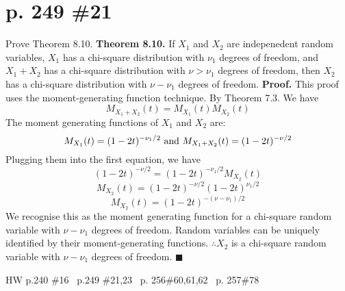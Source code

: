 \documentclass[12pt]{article}
\begin{document}
	\section[20pt]{p. 249 \#21}
	Prove Theorem 8.10.
	\newline \newline
	\textbf{Theorem 8.10. } If \(X_1\) and \(X_2\) are indepenedent random variables, \(X_1\) has a chi-square distribution with \(\nu_1\) degrees of freedom, and \(X_1+X_2\) has a chi-square distribution with \(\nu > \nu_1\) degrees of freedom, then \(X_2\) has a chi-square distribution with \(\nu - \nu_1\) degrees of freedom. \newline
	\textbf{Proof.}
	\newline
	This proof uses the moment-generating function technique.
	\newline
	By Theorem 7.3. We have
	\[M_{X_1 + X_2}(t) = M_{X_1}(t)M_{X_2}(t)\]
	The moment generating functions of \(X_1\) and \(X_2\) are:
	\[M_{X_1}(t)=(1-2t)^{-\nu_1/2} \textup{ and } M_{X_1 + X_2}(t)=(1-2t)^{-\nu/2}\]
	Plugging them into the first equation, we have
	\[(1-2t)^{-\nu/2}=(1-2t)^{-\nu_1/2}M_{X_2}(t)\]
	\[M_{X_2}(t)=(1-2t)^{-\nu/2}(1-2t)^{\nu_1/2}\]
	\[M_{X_2}(t)=(1-2t)^{-(\nu - \nu_1)/2}\]
	We recognise this as the moment generating function for a chi-square random variable with \(\nu - \nu_1\) degrees of freedom. \newline \newline
	Random variables can be uniquely identified by their moment-generating functions.
	\newline
	\(\therefore X_2\) is a chi-square random variable with \(\nu - \nu_1\) degrees of freedom.
	\newline \(\blacksquare\) \newline

	\newpage
	\maketitle HW p.240 \#16 \ p.249 \#21,23 \ p. 256\#60,61,62 \ p. 257\#78
\end{document}
